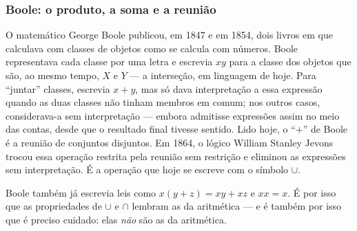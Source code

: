 \subsubsection{Boole: o produto, a soma e a reunião}
O matemático George Boole publicou, em 1847 e em 1854, dois livros em que calculava com classes de objetos como se calcula com números. Boole representava cada classe por uma letra e escrevia $xy$ para a classe dos objetos que são, ao mesmo tempo, $X$ e $Y$ — a interseção, em linguagem de hoje. Para \enquote{juntar} classes, escrevia $x+y$, mas só dava interpretação a essa expressão quando as duas classes não tinham membros em comum; nos outros casos, considerava-a sem interpretação — embora admitisse expressões assim no meio das contas, desde que o resultado final tivesse sentido. Lido hoje, o \enquote{$+$} de Boole é a reunião de conjuntos disjuntos. Em 1864, o lógico William Stanley Jevons trocou essa operação restrita pela reunião sem restrição e eliminou as expressões sem interpretação. É a operação que hoje se escreve com o símbolo $\cup$.

Boole também já escrevia leis como $x(y+z)=xy+xz$ e $xx=x$. É por isso que as propriedades de $\cup$ e $\cap$ lembram as da aritmética — e é também por isso que é preciso cuidado: elas \emph{não} são as da aritmética.

